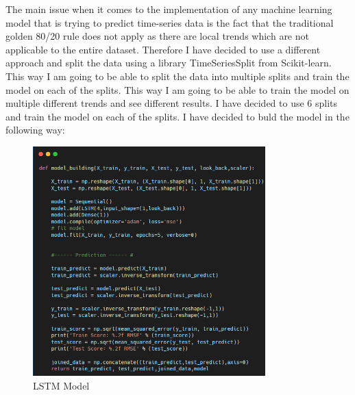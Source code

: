 \documentclass{imc-inf}
\begin{document}
			The main issue when it comes to the implementation of any machine learning model that is trying to predict time-series data is the fact that the traditional golden 80/20 rule does not apply as
			there are local trends which are not applicable to the entire dataset. Therefore I have decided to use a different approach and split the data using a library TimeSeriesSplit from Scikit-learn.
			This way I am going to be able to split the data into multiple splits and train the model on each of the splits. This way I am going to be able to train the model on multiple different trends and
			see different results.
			I have decided to use 6 splits and train the model on each of the splits.
			I have decided to buld the model in the following way:
			\begin{figure}
				\centering
				\includegraphics[width=0.8\textwidth]{lstm_code.png}
				\caption{LSTM Model}
				\label{fig:lstm_model}
			\end{figure}
				
\end{document}
